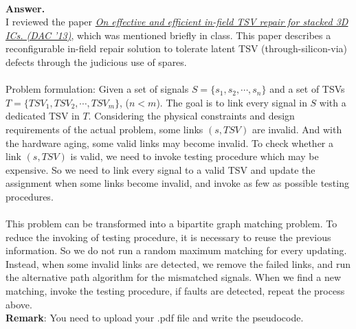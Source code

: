 \documentclass{article}
\begin{document}
\begin{enumerate}
~\\
\textbf{Answer.}~\\
I reviewed the paper \textit{\href{https://doi.org/10.1145/2463209.2488824}{On effective and efficient in-field TSV repair for stacked 3D ICs. (DAC '13)}}, which was mentioned briefly in class. This paper describes a reconfigurable in-field repair solution to tolerate latent TSV (through-silicon-via) defects through the judicious use of spares.\\ 
~\\Problem formulation: Given a set of signals $S=\{s_1,s_2,\cdots,s_n\}$ and a set of TSVs $T=\{TSV_1,TSV_2,\cdots,TSV_m\}$, ($n<m$). The goal is to link every signal in $S$ with a dedicated TSV in $T$. Considering the physical constraints and design requirements of the actual problem, some links $(s, TSV)$ are invalid. And with the hardware aging, some valid links may become invalid. To check whether a link $(s, TSV)$ is valid, we need to invoke testing procedure which may be expensive. So we need to link every signal to a valid TSV and update the assignment when some links become invalid, and invoke as few as possible testing procedures.\\
~\\This problem can be transformed into a bipartite graph matching problem. To reduce the invoking of testing procedure, it is necessary to reuse the previous information. So we do not run a random maximum matching for every updating. Instead, when some invalid links are detected, we remove the failed links, and run the alternative path algorithm for the mismatched signals. When we find a new matching, invoke the testing procedure, if faults are detected, repeat the process above.
~\\

\textbf{Remark}: You need to upload your .pdf file and write the pseudocode.
\end{enumerate}
\end{document}
